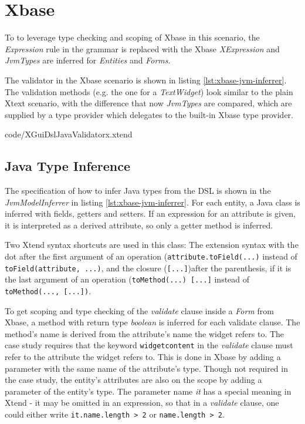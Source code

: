 \section{Xbase}
To to leverage type checking and scoping of Xbase in this scenario, the \emph{Expression} rule in the grammar is replaced with the Xbase \emph{XExpression} and \emph{JvmTypes} are inferred for \emph{Entities} and \emph{Forms}.

The validator in the Xbase scenario is shown in listing \ref{lst:xbase-jvm-inferrer}. The validation methods (e.g. the one for a \emph{TextWidget}) look similar to the plain Xtext scenario, with the difference that now \emph{JvmTypes} are compared, which are supplied by a type provider which delegates to the built-in Xbase type provider.

	{code/XGuiDslJavaValidatorx.xtend}

\subsection{Java Type Inference}
The specification of how to infer Java types from the DSL is shown in the \emph{JvmModelInferrer} in listing \ref{lst:xbase-jvm-inferrer}.  For each entity, a Java class is inferred with fields, getters and setters. If an expression for an attribute is given, it is interpreted as a derived attribute, so only a getter method is inferred.

Two Xtend syntax shortcuts are used in this class: The extension syntax with the dot after the first argument of an operation (\verb|attribute.toField(...)| instead of \verb|toField(attribute, ...)|, and the closure (\verb|[...]|)after the parenthesis, if it is the last argument of an operation (\lstinline[basicstyle=\ttfamily]{toMethod(...) [...]} instead of \lstinline[basicstyle=\ttfamily]{toMethod(..., [...])}.

To get scoping and type checking of the \emph{validate} clause inside a \emph{Form} from Xbase, a method with return type \emph{boolean} is inferred for each validate clause. The method's name is derived from the attribute's name the widget refers to. The case study requires that the keyword \verb|widgetcontent| in the \emph{validate} clause must refer to the attribute the widget refers to. This is done in Xbase by adding a parameter with the same name of the attribute's type. Though not required in the case study, the entity's attributes are also on the scope by adding a parameter of the entity's type. The parameter name \emph{it} has a special meaning in Xtend - it may be omitted in an expression, so that in a \emph{validate} clause, one could either write \lstinline[basicstyle=\ttfamily]{it.name.length > 2} or \verb|name.length > 2|.

